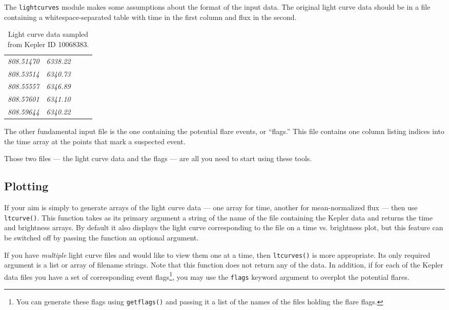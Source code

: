 \documentclass[11pt]{article}
\begin{document}
The \verb|lightcurves| module makes some assumptions about the format
of the input data.  The original light curve data should be in a file
containing a whitespace-separated table with time in the first column
and flux in the second.
\begin{table}[h]
  \centering
  \begin{tabular}{>{\itshape}p{0.2\linewidth} >{\itshape}l}
       808.51470   &   6338.22 \\
       808.53514   &   6340.73 \\
       808.55557   &   6346.89 \\
       808.57601   &   6341.10 \\
       808.59644   &   6340.22 \\
  \end{tabular}
  \caption{Light curve data sampled from Kepler ID 10068383.}
\end{table}

The other fundamental input file is the one containing the potential
flare events, or ``flags.''  This file contains one column listing
indices into the time array at the points that mark a suspected event.

Those two files --- the light curve data and the flags --- are all you
need to start using these tools.



\subsection{Plotting}
\label{sec:basic}
If your aim is simply to generate arrays of the light curve data ---
one array for time, another for mean-normalized flux --- then use
\verb|ltcurve()|.  This function takes as its primary argument a
string of the name of the file containing the Kepler data and returns
the time and brightness arrays.  By default it also displays the light
curve corresponding to the file on a time vs. brightness plot, but
this feature can be switched off by passing the function an optional
argument.

If you have \emph{multiple} light curve files and would like to view
them one at a time, then \verb|ltcurves()| is more appropriate.  Its
only required argument is a list or array of filename strings.  Note
that this function does not return any of the data.  In addition, if
for each of the Kepler data files you have a set of corresponding
event flags\footnote{You can generate these flags using
  \texttt{getflags()} and passing it a list of the names of the files
  holding the flare flags.}, you may use the \verb|flags| keyword
argument to overplot the potential flares.
\end{document}
